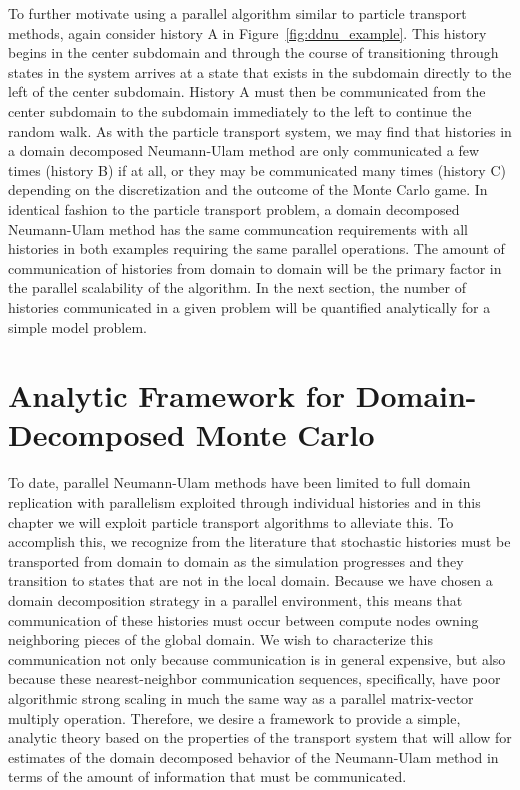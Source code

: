 To further motivate using a parallel algorithm similar to particle
transport methods, again consider history A in
Figure~\ref{fig:ddnu_example}. This history begins in the center
subdomain and through the course of transitioning through states in
the system arrives at a state that exists in the subdomain directly to
the left of the center subdomain. History A must then be communicated
from the center subdomain to the subdomain immediately to the left to
continue the random walk. As with the particle transport system, we
may find that histories in a domain decomposed Neumann-Ulam method are
only communicated a few times (history B) if at all, or they may be
communicated many times (history C) depending on the discretization
and the outcome of the Monte Carlo game. In identical fashion to the
particle transport problem, a domain decomposed Neumann-Ulam method
has the same communcation requirements with all histories in both
examples requiring the same parallel operations. The amount of
communication of histories from domain to domain will be the primary
factor in the parallel scalability of the algorithm. In the next
section, the number of histories communicated in a given problem will
be quantified analytically for a simple model problem.

\clearpage

\section{Analytic Framework for Domain-Decomposed Monte Carlo\ }
\label{sec:analytic_framework}
To date, parallel Neumann-Ulam methods have been limited to full
domain replication with parallelism exploited through individual
histories \citep{alexandrov_efficient_1998} and in this chapter we
will exploit particle transport algorithms to alleviate this. To
accomplish this, we recognize from the literature that stochastic
histories must be transported from domain to domain as the simulation
progresses and they transition to states that are not in the local
domain. Because we have chosen a domain decomposition strategy in a
parallel environment, this means that communication of these histories
must occur between compute nodes owning neighboring pieces of the
global domain. We wish to characterize this communication not only
because communication is in general expensive, but also because these
nearest-neighbor communication sequences, specifically, have poor
algorithmic strong scaling \citep{gropp_high-performance_2001} in much
the same way as a parallel matrix-vector multiply
operation. Therefore, we desire a framework to provide a simple,
analytic theory based on the properties of the transport system that
will allow for estimates of the domain decomposed behavior of the
Neumann-Ulam method in terms of the amount of information that must be
communicated.

